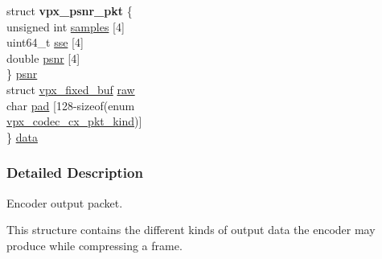 \begin{DoxyCompactItemize}
\begin{tabbing}
\>struct {\bfseries vpx\_psnr\_pkt} \{\\
\>\>unsigned int \hyperlink{structvpx__codec__cx__pkt_a4d3fc7eb2d19c5913c6f3f474e5cf77b}{samples} \mbox{[}4\mbox{]}\\
\>\>uint64\_t \hyperlink{structvpx__codec__cx__pkt_ad65e918d3f26743cc7a8898b88bcb397}{sse} \mbox{[}4\mbox{]}\\
\>\>double \hyperlink{structvpx__codec__cx__pkt_a63744aeceb50355d6402d55309c151b6}{psnr} \mbox{[}4\mbox{]}\\
\>\} \hyperlink{structvpx__codec__cx__pkt_ac91dc0ee23d3d939b85eb82eb5ccc042}{psnr}\\
\>struct \hyperlink{structvpx__fixed__buf}{vpx\_fixed\_buf} \hyperlink{structvpx__codec__cx__pkt_acc7ee91ea9c907aea7c3b953324f7c26}{raw}\\
\>char \hyperlink{structvpx__codec__cx__pkt_a49a0ba012fdabd49bff8069dfacf6ced}{pad} \mbox{[}128-\/sizeof(enum \\
\>\>\hyperlink{group__encoder_ga28a79375279536526552af3a83d2ed72}{vpx\_codec\_cx\_pkt\_kind})\mbox{]}\\
\} \hyperlink{structvpx__codec__cx__pkt_a7f97b060a23b7e89fe5b885c0074f696}{data}\\

\end{tabbing}\end{DoxyCompactItemize}


\subsubsection{Detailed Description}
Encoder output packet. 

This structure contains the different kinds of output data the encoder may produce while compressing a frame. 

